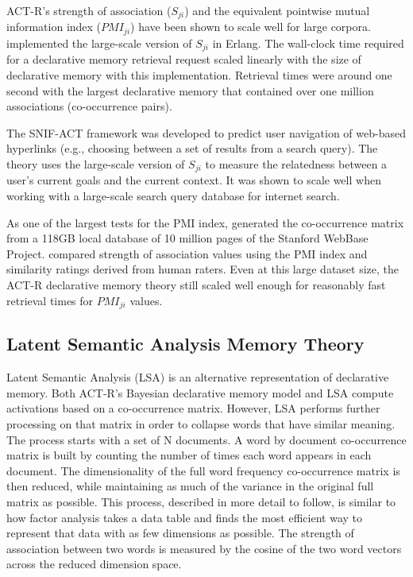 \documentclass[man,floatsintext,donotrepeattitle]{apa6}
\begin{document}
ACT-R's strength of association ($S_{ji}$) and the equivalent pointwise mutual information index ($\mathit{PMI}_{ji}$) have been shown to scale well for large corpora.
\textcite{Douglass2010} implemented the large-scale version of $S_{ji}$ in Erlang.
The wall-clock time required for a declarative memory retrieval request scaled linearly with the size of declarative memory with this implementation.
Retrieval times were around one second with the largest declarative memory that contained over one million associations (co-occurrence pairs).

The SNIF-ACT framework \parencites{Fu2007,Pirolli2003} was developed to predict user navigation of web-based hyperlinks (e.g., choosing between a set of results from a search query).
The theory uses the large-scale version of $S_{ji}$ to measure the relatedness between a user's current goals and the current context.
It was shown to scale well when working with a large-scale search query database for internet search.

As one of the largest tests for the PMI index, \textcite{Farahat2004} generated the co-occurrence matrix from a 118GB local database of 10 million pages of the Stanford WebBase Project.
\citeauthor{Farahat2004} compared strength of association values using the PMI index and similarity ratings derived from human raters.
Even at this large dataset size, the ACT-R declarative memory theory still scaled well enough for reasonably fast retrieval times for $\mathit{PMI}_{ji}$ values.

\subsection{Latent Semantic Analysis Memory Theory}

Latent Semantic Analysis \parencite{Landauer1997} (LSA) is an alternative representation of declarative memory.
Both ACT-R's Bayesian declarative memory model and LSA compute activations based on a co-occurrence matrix.
However, LSA performs further processing on that matrix in order to collapse words that have similar meaning.
The process starts with a set of N documents.
A word by document co-occurrence matrix is built by counting the number of times each word appears in each document.
The dimensionality of the full word frequency co-occurrence matrix is then reduced, while maintaining as much of the variance in the original full matrix as possible.
This process, described in more detail to follow, is similar to how factor analysis takes a data table and finds the most efficient way to represent that data with as few dimensions as possible.
The strength of association between two words is measured by the cosine of the two word vectors across the reduced dimension space.
\end{document}
